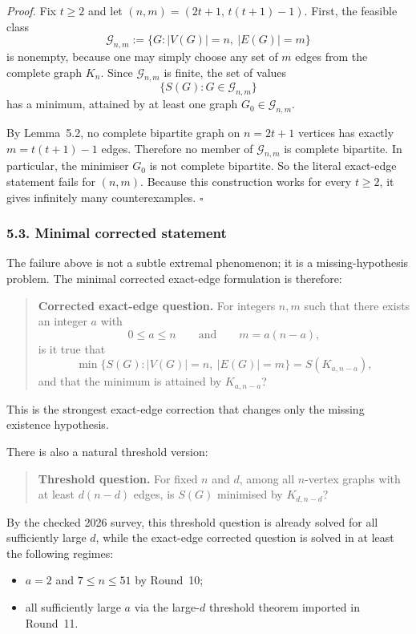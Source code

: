 \medskip
\textit{Proof.}
Fix $t\ge 2$ and let $(n,m)=(2t+1,\,t(t+1)-1)$.
First, the feasible class
\[
\mathcal G_{n,m}:=\{G:|V(G)|=n,\ |E(G)|=m\}
\]
is nonempty, because one may simply choose any set of $m$ edges from the complete graph $K_n$.
Since $\mathcal G_{n,m}$ is finite, the set of values
\[
\{S(G):G\in\mathcal G_{n,m}\}
\]
has a minimum, attained by at least one graph $G_0\in\mathcal G_{n,m}$.

By Lemma~5.2, no complete bipartite graph on $n=2t+1$ vertices has exactly $m=t(t+1)-1$ edges.
Therefore no member of $\mathcal G_{n,m}$ is complete bipartite.
In particular, the minimiser $G_0$ is not complete bipartite.
So the literal exact-edge statement fails for $(n,m)$.
Because this construction works for every $t\ge 2$, it gives infinitely many counterexamples.
\hfill$\square$

\subsubsection*{5.3. Minimal corrected statement}

The failure above is not a subtle extremal phenomenon; it is a missing-hypothesis problem.
The minimal corrected exact-edge formulation is therefore:

\begin{quote}
\textbf{Corrected exact-edge question.}
For integers $n,m$ such that there exists an integer $a$ with
\[
0\le a\le n
\qquad\text{and}\qquad
m=a(n-a),
\]
is it true that
\[
\min\{S(G):|V(G)|=n,\ |E(G)|=m\}=S(K_{a,n-a}),
\]
and that the minimum is attained by $K_{a,n-a}$?
\end{quote}

This is the strongest exact-edge correction that changes only the missing existence hypothesis.

There is also a natural threshold version:
\begin{quote}
\textbf{Threshold question.}
For fixed $n$ and $d$, among all $n$-vertex graphs with at least $d(n-d)$ edges, is $S(G)$ minimised by $K_{d,n-d}$?
\end{quote}

By the checked 2026 survey, this threshold question is already solved for all sufficiently large $d$, while the exact-edge corrected question is solved in at least the following regimes:
\begin{itemize}
\item $a=2$ and $7\le n\le 51$ by Round~10;
\item all sufficiently large $a$ via the large-$d$ threshold theorem imported in Round~11.
\end{itemize}

